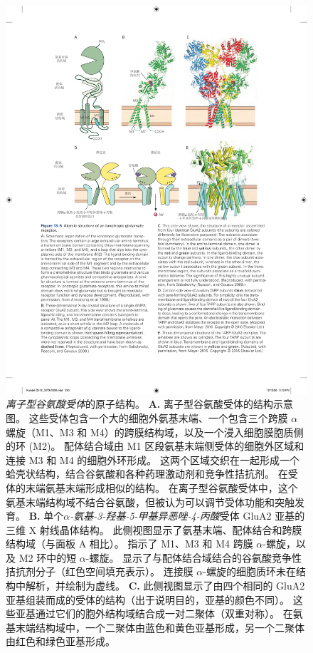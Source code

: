 \begin{figure}[htbp]
	\centering
	\includegraphics[width=0.85\linewidth]{chap13/fig_13_5}
	\caption{\textit{离子型谷氨酸受体}的原子结构。
		\textbf{A.} 离子型谷氨酸受体的结构示意图。 
		这些受体包含一个大的细胞外氨基末端、一个包含三个跨膜 $\alpha$螺旋（M1、M3 和 M4）的跨膜结构域，以及一个浸入细胞膜胞质侧的环 (M2)。
		配体结合域由 M1 区段氨基末端侧受体的细胞外区域和连接 M3 和 M4 的细胞外环形成。
		这两个区域交织在一起形成一个蛤壳状结构，结合谷氨酸和各种药理激动剂和竞争性拮抗剂。
		在受体的末端氨基末端形成相似的结构。
		在离子型谷氨酸受体中，这个氨基末端结构域不结合谷氨酸，但被认为可以调节受体功能和突触发育\cite{armstrong1998structure}。
		\textbf{B.} 单个\textit{$\alpha$-氨基-3-羟基-5-甲基异恶唑-4-丙酸}受体 GluA2 亚基的三维 X 射线晶体结构。
		此侧视图显示了氨基末端、配体结合和跨膜结构域（与面板 A 相比）。
		指示了 M1、M3 和 M4 跨膜 $\alpha$-螺旋，以及 M2 环中的短 $\alpha$-螺旋。
		显示了与配体结合域结合的谷氨酸竞争性拮抗剂分子（红色空间填充表示）。
		连接膜 $\alpha$-螺旋的细胞质环未在结构中解析，并绘制为虚线\cite{sobolevsky2009x}。
		\textbf{C.} 此侧视图显示了由四个相同的 GluA2 亚基组装而成的受体的结构（出于说明目的，亚基的颜色不同）。
		这些亚基通过它们的胞外结构域结合成一对二聚体（双重对称）。
		在氨基末端结构域中，一个二聚体由蓝色和黄色亚基形成，另一个二聚体由红色和绿色亚基形成。
}
\end{figure}
